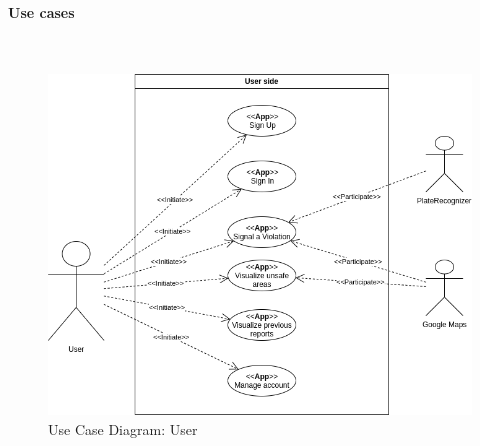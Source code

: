 \documentclass{article}
\begin{document}
\paragraph{Use cases}\mbox{}\\
\begin{figure}[H]
    \centering
    \includegraphics[scale=0.5]{Images/UseCaseUserView}
    \caption{Use Case Diagram: User}
\end{figure}
\end{document}
